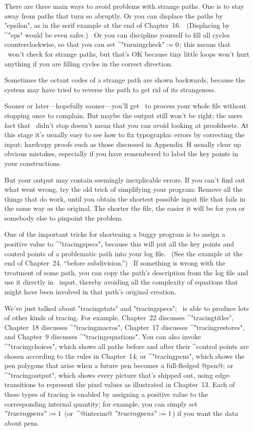 \danger There are three main ways to avoid problems with strange paths.
One is to stay away from paths that turn so abruptly. Or you can displace the
paths by "epsilon", as in the serif example at the end of Chapter~16.
\ (Displacing by ^"eps" would be even safer.) \ Or you can discipline
yourself to fill all cycles counterclockwise, so that you can set
^"turningcheck"$\null:=0$; this means that \MF\ won't check for
strange paths, but that's OK because tiny little loops won't hurt anything
if you are filling cycles in the correct direction.

\ddanger Sometimes the octant codes of a strange path are shown backwards,
because the system may have tried to reverse the path to get rid of
its strangeness.

Sooner or later---hopefully sooner---you'll get \MF\ to process your
whole file without stopping once to complain. But maybe the output
still won't be right; the mere fact that \MF\ didn't stop doesn't mean
that you can avoid looking at proofsheets. At this stage it's usually easy to
see how to fix typographic errors by correcting the input; hardcopy proofs
such as those discussed in Appendix~H usually clear up obvious mistakes,
especially if you have remembered to label the key points in your constructions.

But your output may contain seemingly inexplicable errors.
If you can't find out what went wrong, try the old trick of simplifying
your program: Remove all the things that do work, until you obtain
the shortest possible input file that fails in the same way as the
original. The shorter the file, the easier it will be for you or somebody
else to pinpoint the problem.

\danger One of the important tricks for shortening a buggy program is to
assign a positive value to ^"tracingspecs", because this will put all the
key points and control points of a problematic path into your log file. \
(See the example at the end of Chapter~24, ``before subdivision.'') \ If
something is wrong with the treatment of some path, you can copy the
path's description from the log file and use it directly in \MF\ input,
thereby avoiding all the complexity of equations that might have been
involved in that path's original creation.

\danger We've just talked about "tracingstats" and "tracingspecs";
\MF\ is able to produce lots of other kinds of tracing. For example,
Chapter~22 discusses ^"tracingtitles",
Chapter~18 discusses ^"tracingmacros", Chapter~17 discusses
^"tracingrestores", and Chapter~9 discusses ^"tracingequations".
You can also invoke ^"tracingchoices", which shows all paths before and
after their ^{control points} are chosen according to the rules
in Chapter~14; or ^"tracingpens", which shows the pen polygons that
arise when a future pen becomes a full-fledged @pen@; or ^"tracingoutput",
which shows every picture that's shipped out, using edge-transitions
to represent the pixel values as illustrated in Chapter~13. Each of
these types of tracing is enabled by assigning a positive value to the
corresponding internal quantity; for example, you can simply set
$"tracingpens":=1$ (or~^@interim@ $"tracingpens":=1$)
if you want the data about pens.

